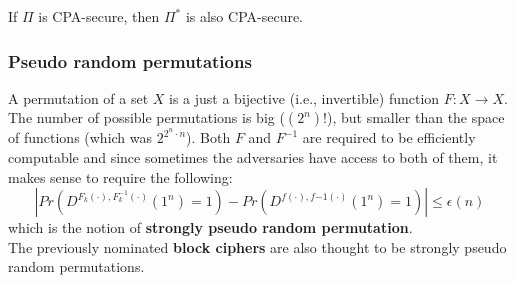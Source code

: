 \documentclass[../main]{subfiles}
\begin{document}
\begin{theorem}
    If $\Pi$ is CPA-secure, then $\Pi^*$ is also CPA-secure.
\end{theorem}

\subsubsection{Pseudo random permutations}
A permutation of a set $X$ is a just a bijective (i.e., invertible) function $F: X \rightarrow{} X$.
The number of possible permutations is big ($(2^n)!$), but smaller than the space of functions (which was $2^{2^n \cdot{} n}$).
Both $F$ and $F^{-1}$ are required to be efficiently computable and since sometimes the adversaries have access to both of them, it makes sense to require the following:
$$|Pr(D^{F_k(\cdot),F^{-1}_k(\cdot)}(1^n)=1)-Pr(D^{f(\cdot),f{-1}(\cdot)}(1^n)=1)| \le{} \epsilon(n)$$
which is the notion of \textbf{strongly pseudo random permutation}.\\
\noindent
The previously nominated \textbf{block ciphers} are also thought to be strongly pseudo random permutations.
\end{document}
